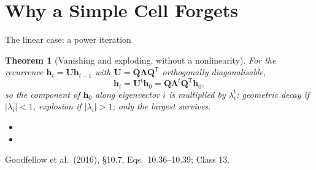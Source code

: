 \documentclass[aspectratio=169, 11pt]{beamer}
\newtheorem{thmx}[theorem]{Theorem}
\newcommand{\srcline}[1]{%
  \par\vspace{0.25em}%
  {\scriptsize\color{mcMuted}\hfill #1\par}}
\newcommand{\src}[3]{}      %
\begin{document}
\section{Why a Simple Cell Forgets}

\begin{frame}{The linear case: a power iteration}
  \src{goodfellow2016}{equation}{10.36-10.39}
  \src{goodfellow2016}{section}{10.7}
  \vspace{-0.45em}
  \begin{thmx}[Vanishing and exploding, without a nonlinearity]\label{th:power}
    \small
    For the recurrence $\mathbf{h}_t = \mathbf{U}\mathbf{h}_{t-1}$ with
    $\mathbf{U} = \mathbf{Q}\bm{\Lambda}\mathbf{Q}^{\mathsf T}$ orthogonally diagonalisable,
    \[
      \mathbf{h}_t = \mathbf{U}^t\mathbf{h}_0 = \mathbf{Q}\bm{\Lambda}^t\mathbf{Q}^{\mathsf T}\mathbf{h}_0 ,
    \]
    so the component of $\mathbf{h}_0$ along eigenvector $i$ is multiplied
    by $\lambda_i^t$: geometric decay if $|\lambda_i| < 1$, explosion if
    $|\lambda_i| > 1$; only the largest survives.
  \end{thmx}
  \vspace{-0.15em}
  {\footnotesize
  \begin{itemize}\itemsep0.12em
    \item {}
    \item {}
  \end{itemize}}
  \vspace{-0.3em}
  \srcline{Goodfellow et al.\ (2016), \S10.7, Eqs.~10.36--10.39; Class 13.}
\end{frame}
\end{document}
